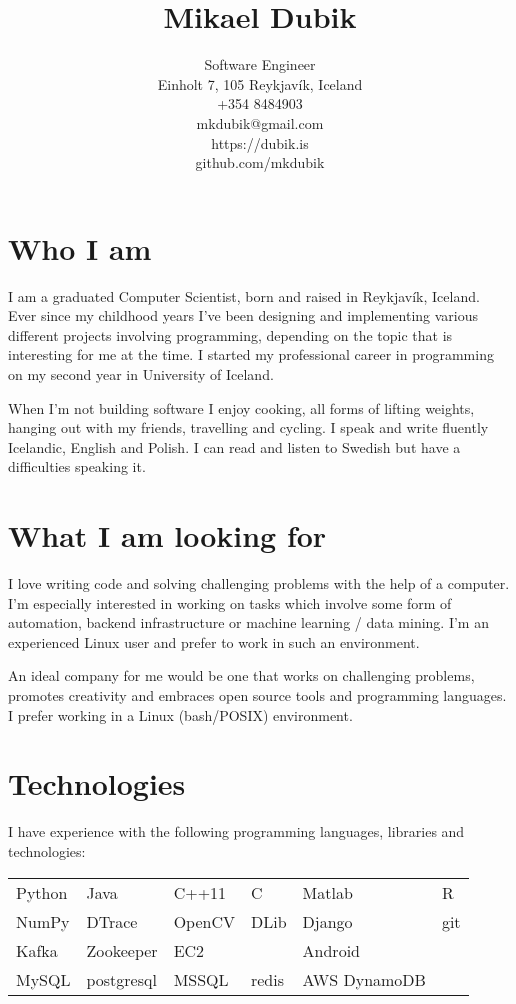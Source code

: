 \documentclass[10pt]{article}
\title{\Huge Mikael Dubik}
\date{}
\author{%
\huge Software Engineer\\
\vspace*{8cm}\Large Einholt 7, 105 Reykjavík, Iceland\\
  +354 8484903\\
  mkdubik@gmail.com\\
  https://dubik.is\\
  github.com/mkdubik\\
}
\makeatletter
\renewcommand{\maketitle}{\bgroup\setlength{\parindent}{0pt}
\begin{flushleft}
\textbf{\@title}

\@author
\end{flushleft}\egroup
}
\makeatother
\begin{document}
\maketitle
\thispagestyle{empty}
\newpage

\begin{flushleft}

\section*{Who I am}
\large I am a graduated Computer Scientist, born and raised in Reykjavík, Iceland. Ever since my childhood years I've been designing and implementing various different projects involving programming, depending on the topic that is interesting for me at the time. I started my professional career in programming on my second year in University of Iceland. \newline

When I'm not building software I enjoy cooking, all forms of lifting weights, hanging out with my friends, travelling and cycling. I speak and write fluently Icelandic, English and Polish. I can read and listen to Swedish but have a difficulties speaking it.  

\section*{What I am looking for}
I love writing code and solving challenging problems with the help of a computer. I'm especially interested in working on tasks which involve some form of automation, backend infrastructure or machine learning / data mining. I'm an experienced Linux user and prefer to work in such an environment. \newline

An ideal company for me would be one that works on challenging problems, promotes creativity and embraces open source tools and programming languages. I prefer working in a Linux (bash/POSIX) environment. 

\section*{Technologies}
I have experience with the following programming languages, libraries and technologies: \newline

\begin{tabular}{ l l l l l l}
Python & Java & C++11 & C & Matlab & R\\
NumPy & DTrace & OpenCV & DLib & Django & git\\
Kafka & Zookeeper & EC2 &  & Android & \\
MySQL & postgresql & MSSQL & redis & AWS DynamoDB \\
\end{tabular}


\end{flushleft}
\end{document}
